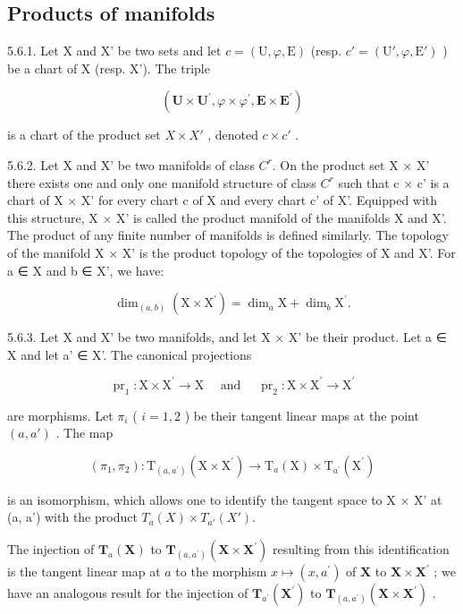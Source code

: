 \subsection{Products of manifolds}

5.6.1. Let X and X' be two sets and let \(c = (\mathrm{U}, \varphi, \mathrm{E})\) (resp. \(c' = (\mathrm{U}', \varphi, \mathrm{E}')\) ) be a chart of X (resp. X'). The triple

\[
(\mathbf {U} \times \mathbf {U} ^ {\prime}, \varphi \times \varphi^ {\prime}, \mathbf {E} \times \mathbf {E} ^ {\prime})
\]

is a chart of the product set \(X \times X'\) , denoted \(c \times c'\) .

5.6.2. Let X and X' be two manifolds of class \(C^{r}\). On the product set X × X' there exists one and only one manifold structure of class \(C^{r}\) such that c × c' is a chart of X × X' for every chart c of X and every chart c' of X'. Equipped with this structure, X × X' is called the product manifold of the manifolds X and X'. The product of any finite number of manifolds is defined similarly. The topology of the manifold X × X' is the product topology of the topologies of X and X'. For a ∈ X and b ∈ X', we have:

\[
\dim_ {(a, b)} (\mathrm{X} \times \mathrm{X} ^ {\prime}) = \dim_ {a} \mathrm{X} + \dim_ {b} \mathrm{X} ^ {\prime}.
\]

5.6.3. Let X and X' be two manifolds, and let X × X' be their product. Let a ∈ X and let a' ∈ X'. The canonical projections

\[
\operatorname{pr} _ {1}: \mathrm{X} \times \mathrm{X} ^ {\prime} \rightarrow \mathrm{X} \quad \text { and } \quad \operatorname{pr} _ {2}: \mathrm{X} \times \mathrm{X} ^ {\prime} \rightarrow \mathrm{X} ^ {\prime}
\]

are morphisms. Let \(\pi_{i}\) ( \(i=1,2\) ) be their tangent linear maps at the point \((a,a')\) . The map

\[
(\pi_ {1}, \pi_ {2}): \mathrm{T} _ {(a, a ^ {\prime})} (\mathrm{X} \times \mathrm{X} ^ {\prime}) \rightarrow \mathrm{T} _ {a} (\mathrm{X}) \times \mathrm{T} _ {a ^ {\prime}} (\mathrm{X} ^ {\prime})
\]

is an isomorphism, which allows one to identify the tangent space to X × X' at (a, a') with the product \(T_{a}(X) \times T_{a'}(X')\).

The injection of \(\mathbf{T}_{a}(\mathbf{X})\) to \(\mathbf{T}_{(a,a^{\prime})}(\mathbf{X}\times \mathbf{X}^{\prime})\) resulting from this identification is the tangent linear map at \(a\) to the morphism \(x\mapsto (x,a^{\prime})\) of \(\mathbf{X}\) to \(\mathbf{X}\times \mathbf{X}^{\prime}\) ; we have an analogous result for the injection of \(\mathbf{T}_{a^{\prime}}(\mathbf{X}^{\prime})\) to \(\mathbf{T}_{(a,a^{\prime})}(\mathbf{X}\times \mathbf{X}^{\prime})\) .

